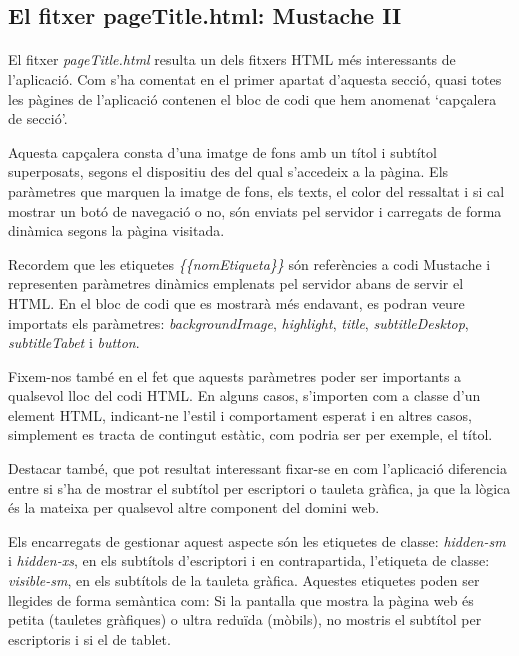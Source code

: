 \subsection{El fitxer pageTitle.html: Mustache II}

    \paragraph{}
    El fitxer \emph{pageTitle.html} resulta un dels fitxers HTML més interessants de l'aplicació. Com s'ha comentat en el primer apartat d'aquesta secció, quasi totes les pàgines de l'aplicació contenen el bloc de codi que hem anomenat `capçalera de secció'.

    Aquesta capçalera consta d'una imatge de fons amb un títol i subtítol superposats, segons el dispositiu des del qual s'accedeix a la pàgina. Els paràmetres que marquen la imatge de fons, els texts, el color del ressaltat i si cal mostrar un botó de navegació o no, són enviats pel servidor i carregats de forma dinàmica segons la pàgina visitada.

    Recordem que les etiquetes \emph{\{\{nomEtiqueta\}\}} són referències a codi Mustache i representen paràmetres dinàmics emplenats pel servidor abans de servir el HTML. En el bloc de codi que es mostrarà més endavant, es podran veure importats els paràmetres: \emph{backgroundImage}, \emph{highlight}, \emph{title}, \emph{subtitleDesktop}, \emph{subtitleTabet} i \emph{button}.

    Fixem-nos també en el fet que aquests paràmetres poder ser importants a qualsevol lloc del codi HTML. En alguns casos, s'importen com a classe d'un element HTML, indicant-ne l'estil i comportament esperat i en altres casos, simplement es tracta de contingut estàtic, com podria ser per exemple, el títol.

    Destacar també, que pot resultat interessant fixar-se en com l'aplicació diferencia entre si s'ha de mostrar el subtítol per escriptori o tauleta gràfica, ja que la lògica és la mateixa per qualsevol altre component del domini web.

    Els encarregats de gestionar aquest aspecte són les etiquetes de classe: \emph{hidden-sm} i \emph{hidden-xs}, en els subtítols d'escriptori i en contrapartida, l'etiqueta de classe: \emph{visible-sm}, en els subtítols de la tauleta gràfica. Aquestes etiquetes poden ser llegides de forma semàntica com: Si la pantalla que mostra la pàgina web és petita (tauletes gràfiques) o ultra reduïda (mòbils), no mostris el subtítol per escriptoris i si el de tablet.

